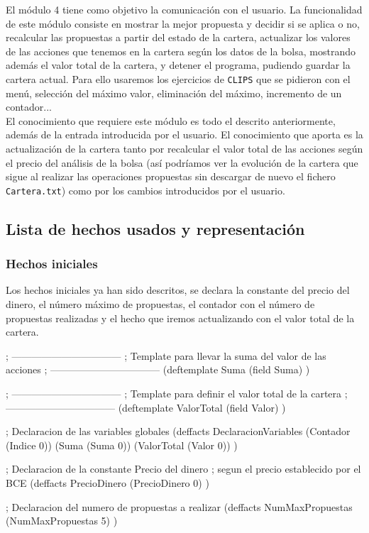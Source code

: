 \documentclass[11pt,leqno]{article}
\theoremstyle{definition_wo_parentheses}
\theoremstyle{plain}
\theoremstyle{remark}
\begin{document}
	El módulo 4 tiene como objetivo la comunicación con el usuario. La funcionalidad de este módulo consiste en mostrar la mejor propuesta y decidir si se aplica o no, recalcular las propuestas a partir del estado de la cartera, actualizar los valores de las acciones que tenemos en la cartera según los datos de la bolsa, mostrando además el valor total de la cartera, y detener el programa, pudiendo guardar la cartera actual. Para ello usaremos los ejercicios de \texttt{CLIPS} que se pidieron con el menú, selección del máximo valor, eliminación del máximo, incremento de un contador...\\
	El conocimiento que requiere este módulo es todo el descrito anteriormente, además de la entrada introducida por el usuario. El conocimiento que aporta es la actualización de la cartera tanto por recalcular el valor total de las acciones según el precio del análisis de la bolsa (así podríamos ver la evolución de la cartera que sigue al realizar las operaciones propuestas sin descargar de nuevo el fichero \texttt{Cartera.txt}) como por los cambios introducidos por el usuario.
	
	
\subsection{Lista de hechos usados y representación}

\subsubsection{Hechos iniciales}

	Los hechos iniciales ya han sido descritos, se declara la constante del precio del dinero, el número máximo de propuestas, el contador con el número de propuestas realizadas y el hecho que iremos actualizando con el valor total de la cartera.
	
\begin{clips-code}
; ---------------------------------
; Template para llevar la suma del valor de las acciones
; ---------------------------------
(deftemplate Suma
  (field Suma)
)

; ---------------------------------
; Template para definir el valor total de la cartera
; ---------------------------------
(deftemplate ValorTotal
  (field Valor)
)

; Declaracion de las variables globales
(deffacts DeclaracionVariables
  (Contador (Indice 0))
  (Suma (Suma 0))
  (ValorTotal (Valor 0))
)

; Declaracion de la constante Precio del dinero
;   segun el precio establecido por el BCE
(deffacts PrecioDinero
  (PrecioDinero 0)
)

; Declaracion del numero de propuestas a realizar
(deffacts NumMaxPropuestas
  (NumMaxPropuestas 5)
)
\end{clips-code}
\end{document}
